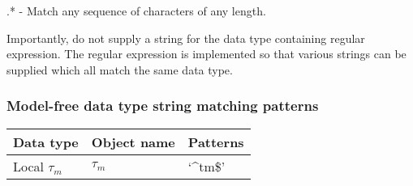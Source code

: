     .* - Match any sequence of characters of any length.

Importantly, do not supply a string for the data type containing regular expression.  The
regular expression is implemented so that various strings can be supplied which all match
the same data type.


\subsubsection{Model-free data type string matching patterns}



\begin{center}
\begin{tabular}{lll}
\toprule
Data type & Object name & Patterns \\
\midrule
 Local $\tau_m$                &  $\tau_m$            &  `\^{}tm\$'                                            \\
\bottomrule
\end{tabular}
\end{center}

